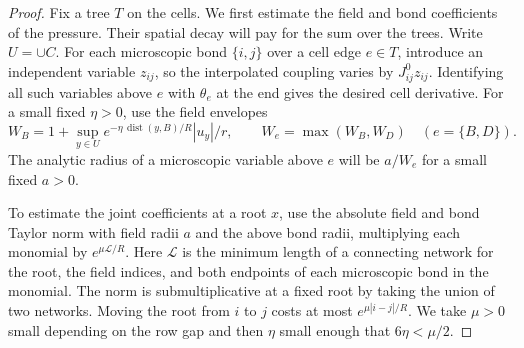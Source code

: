\documentclass[11pt]{article}
\theoremstyle{definition}
\begin{document}
\begin{proof}
Fix a tree \(T\) on the cells. We first estimate the field and bond
coefficients of the pressure. Their spatial decay will pay for the
sum over the trees. Write \(U=\cup C\). For each microscopic bond
\(\{i,j\}\) over a cell edge \(e\in T\), introduce an independent
variable \(z_{ij}\), so the interpolated coupling varies by
\(J^0_{ij}z_{ij}\). Identifying all such variables above \(e\)
with \(\theta_e\) at the end gives the desired cell derivative.
For a small fixed \(\eta>0\), use the field envelopes
\begin{equation}
 W_B=1+\sup_{y\in U}e^{-\eta\,\operatorname{dist}(y,B)/R}|u_y|/r,
 \qquad W_e=\max(W_B,W_D)\quad(e=\{B,D\}).
\end{equation}
The analytic radius of a microscopic variable above \(e\) will
be \(a/W_e\) for a small fixed \(a>0\).

To estimate the joint coefficients at a root \(x\), use the
absolute field and bond Taylor norm with field radii \(a\) and
the above bond radii, multiplying each monomial by
\(e^{\mu\mathcal L/R}\). Here \(\mathcal L\) is the minimum length
of a connecting network for the root, the field indices, and both
endpoints of each microscopic bond in the monomial. The norm is
submultiplicative at a fixed root by taking the union of two
networks. Moving the root from \(i\) to \(j\) costs at most
\(e^{\mu|i-j|/R}\). We take \(\mu>0\) small depending on the row
gap and then \(\eta\) small enough that \(6\eta<\mu/2\).


\end{proof}
\end{document}
